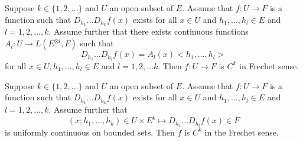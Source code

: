 \begin{prop}
    Suppose $k \in \{ 1, 2, \ldots\}$ and $U$ an open subset of $E$. Assume that $f: U \rightarrow F$ is a function such that $D_{h_1} \ldots D_{h_k} f(x)$ exists for all $x \in U$ and $h_1, \ldots, h_l \in E$ and $l = 1, 2, \ldots, k$. Assume further that there exists continuous functions $A_l: U \rightarrow L(E^{\otimes l}, F)$ such that 
    \begin{equation}
        D_{h_1} \ldots D_{h_l} f(x) = A_l(x) < h_1, \ldots, h_l> 
    \end{equation}
    for all $x \in U, h_1, \ldots, h_l \in E$ and $l = 1, 2, \ldots k.$ Then $f: U \rightarrow F$ is $C^k$ in Frechet sense.
\end{prop}

\begin{prop}
    Suppose $k \in \{ 1, 2, \ldots\}$ and $U$ an open subset of $E$. Assume that $f: U \rightarrow F$ is a function such that $D_{h_1} \ldots D_{h_k} f(x)$ exists for all $x \in U$ and $h_1, \ldots, h_l \in E$ and $l = 1, 2, \ldots, k$. Assume further that 
    \begin{equation}
        (x; h_1, \ldots, h_k) \in U \times E^k \mapsto D_{h_1} \ldots D_{h_l} f(x) \in F
    \end{equation}
    is uniformly continuous on bounded sets. Then $f$ is $C^k$ in the Frechet sense.
\end{prop}